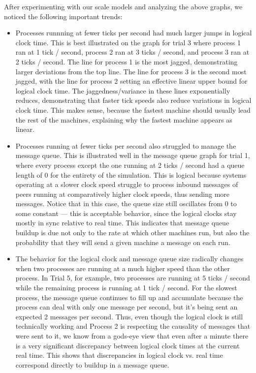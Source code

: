 \documentclass[
	a4paper, %
	10pt, %
	unnumberedsections, %
	twoside, %
]{LTJournalArticle}
\begin{document}
\vspace{1mm}

After experimenting with our scale models and analyzing the above graphs, we noticed the following important trends: 
\begin{itemize}
    \item Processes runnning at fewer ticks per second had much larger jumps in logical clock time. This is best illustrated on the graph for trial 3 where process 1 ran at 1 tick / second, process 2 ran at 3 ticks / second, and process 3 ran at 2 ticks / second. The line for process 1 is the most jagged, demonstrating larger deviations  from the top line. The line for process 3 is the second most jagged, with the line for process 2 setting an effective linear upper bound for logical clock time. The jaggedness/variance in these lines exponentially reduces, demonstrating that faster tick speeds also reduce variations in logical clock time. This makes sense, because the fastest machine should usually lead the rest of the machines, explaining why the fastest machine appears as linear.
    \item Processes running at fewer ticks per second also struggled to manage the message queue. This is illustrated well in the message queue graph for trial 1, where every process except the one running at 2 ticks / second had a queue length of 0 for the entirety of the simulation. This is logical because systems operating at a slower clock speed struggle to process inbound messages of peers running at comparatively higher clock speeds, thus sending more messages. Notice that in this case, the queue size still oscillates from 0 to some constant --- this is acceptable behavior, since the logical clocks stay mostly in sync relative to real time. This indicates that message queue buildup is due not only to the rate at which other machines run, but also the probability that they will send a given machine a message on each run. 
    \item The behavior for the logical clock and message queue size radically changes when two processes are running at a much higher speed than the other process. In Trial 5, for example, two processes are running at 5 ticks / second while the remaining process is running at 1 tick / second. For the slowest process, the message queue continues to fill up and accumulate because the process can deal with only one message per second, but it's being sent an expected 2 messages per second. Thus, even though the logical clock is still technically working and Process 2 is respecting the causality of messages that were sent to it, we know from a gods-eye view that even after a minute there is a very significant discrepancy between logical clock times at the current real time. This shows that discrepancies in logical clock vs. real time correspond directly to buildup in a message queue.
\end{itemize}
\end{document}
